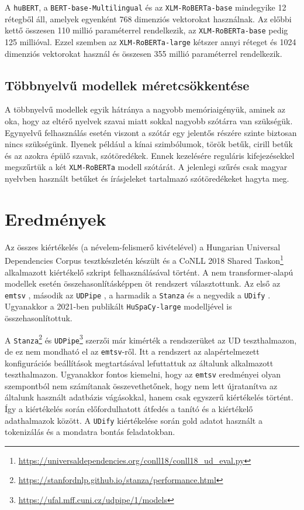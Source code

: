 \documentclass{llncs}
\newcommand{\emtsv}{\texttt{emtsv}}
\newcommand{\hubert}{\texttt{huBERT}}
\newcommand{\huspacyl}{\texttt{HuSpaCy-large}}
\newcommand{\roberta}{\texttt{XLM-RoBERTa}}
\newcommand{\robertaB}{\texttt{XLM-RoBERTa-base}}
\newcommand{\robertaL}{\texttt{XLM-RoBERTa-large}}
\newcommand{\bertmulti}{\texttt{BERT-base-Multilingual}}
\newcommand{\udpipe}{\texttt{UDPipe}}
\newcommand{\stanza}{\texttt{Stanza}}
\newcommand{\udify}{\texttt{UDify}}
\newcommand{\trf}{transformer}
\begin{document}
A \hubert{}, a \bertmulti{} és az \robertaB{} mindegyike 12 rétegből áll, amelyek egyenként 768 dimenziós vektorokat használnak. Az előbbi kettő összesen 110 millió paraméterrel rendelkezik, az \robertaB{} pedig 125 millióval. Ezzel szemben az \robertaL{} kétszer annyi réteget és 1024 dimenziós vektorokat használ és összesen 355 millió paraméterrel rendelkezik.

\subsection{Többnyelvű modellek méretcsökkentése}
\label{roberta_size}

A többnyelvű modellek egyik hátránya a nagyobb memóriaigényük, aminek az oka, hogy az eltérő nyelvek szavai miatt sokkal nagyobb szótárra van szükségük. Egynyelvű felhasználás esetén viszont a szótár egy jelentős részére szinte biztosan nincs szükségünk. Ilyenek például a kínai szimbólumok, török betűk, cirill betűk és az azokra épülő szavak, szótöredékek. Ennek kezelésére reguláris kifejezésekkel megszűrtük a két \roberta{} modell szótárát. A jelenlegi szűrés csak magyar nyelvben használt betűket és írásjeleket tartalmazó szótöredékeket hagyta meg.

\section{Eredmények}

Az összes kiértékelés (a névelem-felismerő kivételével) a Hungarian Universal Dependencies Corpus
tesztkészletén \citep{UniDep} készült és a CoNLL 2018 Shared Taskon\footnote{\url{https://universaldependencies.org/conll18/conll18_ud_eval.py}} alkalmazott kiértékelő szkript felhasználásával történt. A nem \trf{}-alapú modellek esetén összehasonlításképpen öt rendszert választottunk. Az első az \emtsv{} \citep{emtsv1, emtsv2, emtsv3, emtsv4, emtsv5}, második az \udpipe{} \citep{udpipe}, a harmadik a \stanza{} \citep{qi2020stanza} és a negyedik a \udify{} \citep{udify}. Ugyanakkor a 2021-ben publikált \huspacyl{} \citep{huspacy} modelljével is összehasonlítottuk.


A \stanza{}\footnote{\url{https://stanfordnlp.github.io/stanza/performance.html}} és \udpipe{}\footnote{\url{https://ufal.mff.cuni.cz/udpipe/1/models}} szerzői már kimérték a rendszerüket az UD teszthalmazon, de ez nem mondható el az \emtsv{}-ről. Itt a rendszert az alapértelmezett konfigurációs beállítások megtartásával lefuttattuk az általunk alkalmazott teszthalmazon. Ugyanakkor fontos kiemelni, hogy az \emtsv{} eredményei olyan szempontból nem számítanak összevethetőnek, hogy nem lett újratanítva az általunk használt adatbázis vágásokkal, hanem csak egyszerű kiértékelés történt. Így a kiértékelés során előfordulhatott átfedés a tanító és a kiértékelő adathalmazok között. A \udify{} kiértékelése során gold adatot használt a tokenizálás és a mondatra bontás feladatokban.
\end{document}
